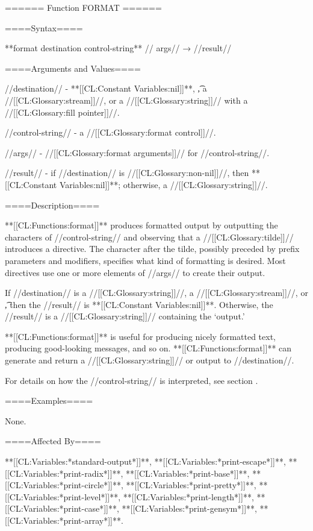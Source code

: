 ====== Function FORMAT ======

====Syntax====

**{format} {destination control-string** //\rest} args// → //result//

====Arguments and Values====

//destination// - **[[CL:Constant Variables:nil]]**, \t, a //[[CL:Glossary:stream]]//, or a //[[CL:Glossary:string]]// with a //[[CL:Glossary:fill pointer]]//.

//control-string// - a //[[CL:Glossary:format control]]//.

//args// - //[[CL:Glossary:format arguments]]// for //control-string//.

//result// - if //destination// is //[[CL:Glossary:non-nil]]//, then **[[CL:Constant Variables:nil]]**; otherwise, a //[[CL:Glossary:string]]//.

====Description====

**[[CL:Functions:format]]** produces formatted output by outputting the characters of //control-string// and observing that a //[[CL:Glossary:tilde]]// introduces a directive. The character after the tilde, possibly preceded by prefix parameters and modifiers, specifies what kind of formatting is desired. Most directives use one or more elements of //args// to create their output.

If //destination// is a //[[CL:Glossary:string]]//, a //[[CL:Glossary:stream]]//, or \t, then the //result// is **[[CL:Constant Variables:nil]]**. Otherwise, the //result// is a //[[CL:Glossary:string]]// containing the `output.'

**[[CL:Functions:format]]** is useful for producing nicely formatted text, producing good-looking messages, and so on. **[[CL:Functions:format]]** can generate and return a //[[CL:Glossary:string]]// or output to //destination//.

For details on how the //control-string// is interpreted, see section {\secref\FormattedOutput}.

====Examples====

None.

====Affected By====

**[[CL:Variables:*standard-output*]]**, **[[CL:Variables:*print-escape*]]**, **[[CL:Variables:*print-radix*]]**, **[[CL:Variables:*print-base*]]**, **[[CL:Variables:*print-circle*]]**, **[[CL:Variables:*print-pretty*]]**, **[[CL:Variables:*print-level*]]**, **[[CL:Variables:*print-length*]]**, **[[CL:Variables:*print-case*]]**, **[[CL:Variables:*print-gensym*]]**, **[[CL:Variables:*print-array*]]**.

